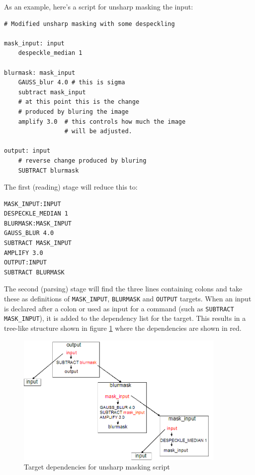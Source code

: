 \documentclass[12pt, a4paper]{article}
\begin{document}
As an example, here's a script for unsharp masking the input:
\begin{verbatim}
# Modified unsharp masking with some despeckling

mask_input: input
    despeckle_median 1

blurmask: mask_input 
    GAUSS_blur 4.0 # this is sigma
    subtract mask_input
    # at this point this is the change
    # produced by bluring the image
    amplify 3.0  # this controls how much the image
                 # will be adjusted.

output: input
    # reverse change produced by bluring
    SUBTRACT blurmask
\end{verbatim}
The first (reading) stage will reduce this to:
\begin{verbatim}
MASK_INPUT:INPUT
DESPECKLE_MEDIAN 1
BLURMASK:MASK_INPUT 
GAUSS_BLUR 4.0
SUBTRACT MASK_INPUT
AMPLIFY 3.0
OUTPUT:INPUT
SUBTRACT BLURMASK
\end{verbatim}
The second (parsing) stage will find the three lines containing colons
and take these as definitions of \texttt{MASK\_INPUT}, \texttt{BLURMASK}
and \texttt{OUTPUT} targets. When an input is declared after a colon or used
as input for a command (such as \texttt{SUBTRACT MASK\_INPUT}), 
it is added to the dependency list for the target. 
This results in a tree-like structure shown in figure \ref{targetdeps} where
the dependencies are shown in red. 
\begin{figure}[ht]
\centering
\includegraphics[width=0.9\textwidth]{script1.png}
\caption{Target dependencies for unsharp masking script}
\label{targetdeps}
\end{figure}
\end{document}
